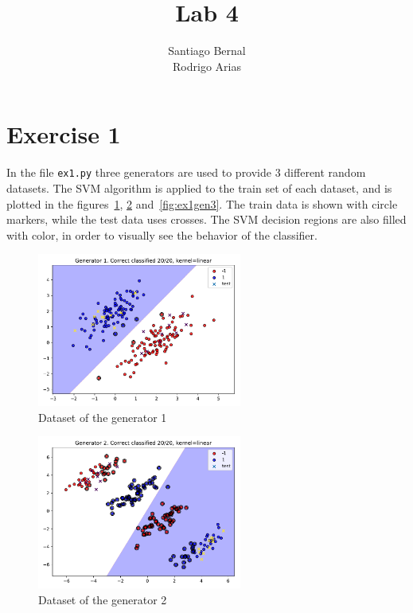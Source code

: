 \documentclass[12pt,a4paper]{article}
\title{Lab 4}
\author{Santiago Bernal \\ Rodrigo Arias}
\begin{document}
\maketitle

\section*{Exercise 1}
%
%
In the file \texttt{ex1.py} three generators are used to provide 3 different 
random datasets.
%
%
The SVM algorithm is applied to the train set of each dataset, and is plotted in 
the figures~\ref{fig:ex1gen1}, \ref{fig:ex1gen2} and~\ref{fig:ex1gen3}.
%
%
The train data is shown with circle markers, while the test data uses crosses.  
The SVM decision regions are also filled with color, in order to visually see 
the behavior of the classifier.
%
%
\begin{figure}[h]
	\centering
	\includegraphics[width=0.6\textwidth]{ex1/1.pdf}
	\caption{Dataset of the generator 1}
	\label{fig:ex1gen1}
\end{figure}
\begin{figure}[h]
	\centering
	\includegraphics[width=0.6\textwidth]{ex1/2.pdf}
	\caption{Dataset of the generator 2}
	\label{fig:ex1gen2}
\end{figure}
\end{document}
